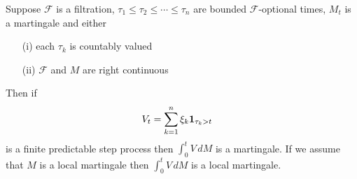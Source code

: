 \begin{lem}\label{StochasticIntegralFinitePredictableStepProcess}Suppose $\mathcal{F}$ is a filtration,  $\tau_1 \leq \tau_2 \leq \dotsb \leq \tau_n$ are bounded $\mathcal{F}$-optional times, $M_t$ is a martingale
and either 
\begin{itemize}
\item[(i)] each $\tau_k$ is countably valued
\item[(ii)]$\mathcal{F}$ and $M$ are right continuous
\end{itemize}
Then if
\begin{align*}
V_t &= \sum_{k=1}^n \xi_k \textbf{1}_{\tau_{k} > t}
\end{align*}
is a finite predictable step process then $\int_0^t V \, dM$ is a martingale.  If we assume that $M$ is a local martingale then $\int_0^t V \, dM$ is a local martingale.
\end{lem}
